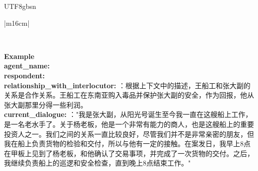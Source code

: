 \documentclass[11pt]{article}
\begin{document}
{\begin{CJK}{UTF8}{gbsn}
\begin{table}[ht!]
\begin{tabular}{|m{16cm}|}
\begin{minipage}[t]{\linewidth}
\begin{verbatim}
\end{verbatim}
\end{minipage} \\
\hline
{}  \textbf{Example}  \\
 \textbf{   agent\_name:} \\
\textbf{   respondent:} \\
\textbf{   relationship\_with\_interlocutor:} ：根据上下文中的描述，王船工和张大副的关系是合作关系。王船工在东南亚购入毒品并保护张大副的安全，作为回报，他从张大副那里分得一些利润。 \\
\textbf{   current\_dialogue:} ："我是张大副，从阳光号诞生至今我一直在这艘船上工作，是一名老水手了。关于杨老板，他是一个非常有能力的商人，也是这艘船上的重要投资人之一。我们之间的关系一直比较良好，尽管我们并不是非常亲密的朋友，但我在船上负责货物的检验和交付，所以与他有一定的接触。在案发日，我早上8点在甲板上见到了杨老板，和他确认了交易事项，并完成了一次货物的交付。之后，我继续负责船上的巡逻和安全检查，直到晚上8点结束工作。"\\


\end{tabular}
\end{table}
\end{CJK}}
\end{document}
